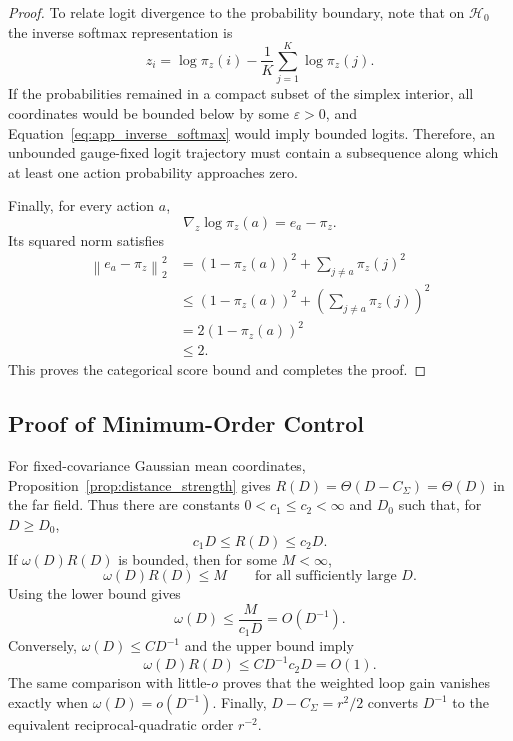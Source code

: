 \documentclass[sigconf,anonymous,review]{acmart}
\theoremstyle{acmdefinition}
\begin{document}
\begin{proof}
To relate logit divergence to the probability boundary, note that on
$\mathcal{H}_0$ the inverse softmax representation is
\begin{equation}
    z_i
    =
    \log\pi_z(i)
    -
    \frac{1}{K}
    \sum_{j=1}^{K}
    \log\pi_z(j).
    \label{eq:app_inverse_softmax}
\end{equation}
If the probabilities remained in a compact subset of the simplex
interior, all coordinates would be bounded below by some
$\varepsilon>0$, and
Equation~\eqref{eq:app_inverse_softmax} would imply bounded logits.
Therefore, an unbounded gauge-fixed logit trajectory must contain a
subsequence along which at least one action probability approaches zero.

Finally, for every action $a$,
\begin{equation}
    \nabla_z\log\pi_z(a)
    =
    e_a-\pi_z.
\end{equation}
Its squared norm satisfies
\begin{equation}
\begin{aligned}
    \left\|
        e_a-\pi_z
    \right\|_2^2
    &=
    \left(
        1-\pi_z(a)
    \right)^2
    +
    \sum_{j\neq a}
    \pi_z(j)^2 \\
    &\leq
    \left(
        1-\pi_z(a)
    \right)^2
    +
    \left(
        \sum_{j\neq a}
        \pi_z(j)
    \right)^2 \\
    &=
    2
    \left(
        1-\pi_z(a)
    \right)^2 \\
    &\leq
    2.
\end{aligned}
\end{equation}
This proves the categorical score bound and completes the proof.
\end{proof}

\subsection{Proof of Minimum-Order Control}
\label{app:min_order_control}

For fixed-covariance Gaussian mean coordinates,
Proposition~\ref{prop:distance_strength} gives
\(R(D)=\Theta(D-C_\Sigma)=\Theta(D)\) in the far field. Thus there are
constants \(0<c_1\le c_2<\infty\) and \(D_0\) such that, for
\(D\ge D_0\),
\[
    c_1 D
    \le
    R(D)
    \le
    c_2 D .
\]
If \(\omega(D)R(D)\) is bounded, then for some \(M<\infty\),
\[
    \omega(D)R(D)\le M
    \qquad
    \text{for all sufficiently large } D .
\]
Using the lower bound gives
\[
    \omega(D)
    \le
    \frac{M}{c_1D}
    =
    O(D^{-1}).
\]
Conversely, \(\omega(D)\le CD^{-1}\) and the upper bound imply
\[
    \omega(D)R(D)
    \le
    CD^{-1}c_2D
    =
    O(1).
\]
The same comparison with little-\(o\) proves that the weighted loop gain
vanishes exactly when \(\omega(D)=o(D^{-1})\). Finally,
\(D-C_\Sigma=r^2/2\) converts \(D^{-1}\) to the equivalent
reciprocal-quadratic order \(r^{-2}\).
\end{document}
